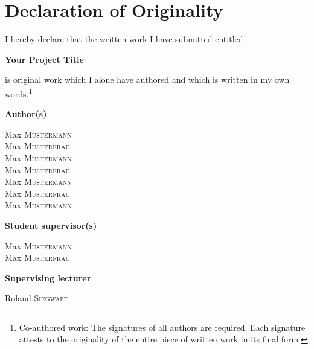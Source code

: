 
\section*{Declaration of Originality}

I hereby declare that the written work I have submitted entitled

\vspace{0.5cm}

\textbf{Your Project Title}

\vspace{0.5cm}

is original work which I alone have authored and which is written in my own words.\footnote{Co-authored work: The signatures of all authors are required. Each signature attests to the originality of the entire piece of written work in its final form.}

\begin{multicols}{2}
\vspace{0.5cm}
    \textbf{Author(s)}
    \vspace{0.2cm}
    
    Max \textsc{Mustermann} \\
    Max \textsc{Musterfrau} \\ %
    Max \textsc{Mustermann} \\
    Max \textsc{Musterfrau} \\
    Max \textsc{Mustermann} \\
    Max \textsc{Musterfrau} \\
    Max \textsc{Mustermann} \\
    
    \vfill\null
    \columnbreak

    \textbf{Student supervisor(s)}
    \vspace{0.2cm}
    
    Max \textsc{Mustermann} \\
    Max \textsc{Musterfrau}\\
    
    \vspace{0.2cm}
    
    \textbf{Supervising lecturer}
    
    \vspace{0.2cm}
    
    Roland \textsc{Siegwart}
    
    \vspace{1cm}
    
    \end{multicols}

